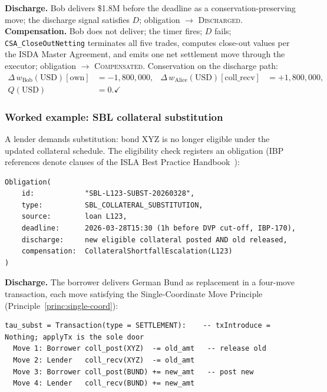 \noindent \textbf{Discharge.} Bob delivers \$1.8M before the deadline as a conservation-preserving move; the discharge signal satisfies $D$; obligation $\to$ \textsc{Discharged}. \textbf{Compensation.} Bob does not deliver; the timer fires; $D$ fails; \texttt{CSA\_CloseOutNetting} terminates all five trades, computes close-out values per the ISDA Master Agreement, and emits one net settlement move through the executor; obligation $\to$ \textsc{Compensated}. Conservation on the discharge path:
\begin{align*}
\Delta\, w_{\mathrm{Bob}}(\text{USD})[\mathrm{own}] &= -1{,}800{,}000, &
\Delta\, w_{\mathrm{Alice}}(\text{USD})[\mathrm{coll\_recv}] &= +1{,}800{,}000, \\
Q(\text{USD}) &= 0. \checkmark
\end{align*}

\subsubsection{Worked example: SBL collateral substitution}
\label{sec:obligation-example-sbl}

A lender demands substitution: bond XYZ is no longer eligible under the updated collateral schedule. The eligibility check registers an obligation (IBP references denote clauses of the ISLA Best Practice Handbook~\cite{isla-ibp}):

\begin{lstlisting}
Obligation(
    id:            "SBL-L123-SUBST-20260328",
    type:          SBL_COLLATERAL_SUBSTITUTION,
    source:        loan L123,
    deadline:      2026-03-28T15:30 (1h before DVP cut-off, IBP-170),
    discharge:     new eligible collateral posted AND old released,
    compensation:  CollateralShortfallEscalation(L123)
)
\end{lstlisting}

\noindent \textbf{Discharge.} The borrower delivers German Bund as replacement in a four-move transaction, each move satisfying the Single-Coordinate Move Principle (Principle~\ref{princ:single-coord}):

\begin{lstlisting}
tau_subst = Transaction(type = SETTLEMENT):    -- txIntroduce = Nothing; applyTx is the sole door
  Move 1: Borrower coll_post(XYZ)  -= old_amt   -- release old
  Move 2: Lender   coll_recv(XYZ)  -= old_amt
  Move 3: Borrower coll_post(BUND) += new_amt   -- post new
  Move 4: Lender   coll_recv(BUND) += new_amt
\end{lstlisting}

